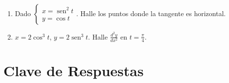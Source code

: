 \documentclass[12pt, letterpaper]{article}
\begin{document}
\begin{enumerate}[leftmargin=*]
  \item \muyDificil{} Dado $\begin{cases} x = \operatorname{sen}^2 t \\ y = \cos t \end{cases}$. Halle los puntos donde la tangente es horizontal.

  \item \muyDificil{} $x = 2\cos^3 t$, $y = 2\operatorname{sen}^3 t$. Halle $\frac{d^2y}{dx^2}$ en $t = \frac{\pi}{4}$.

\end{enumerate}

\newpage
\ifmwclaves
  \section{Clave de Respuestas}
\end{document}
